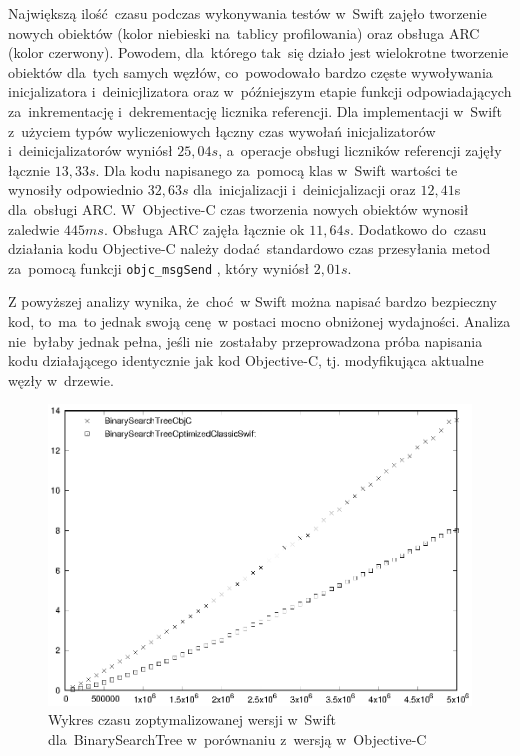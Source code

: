 \documentclass[mgr, shortabstract]{iithesis}
\newcommand{\objcinline}[1]{
    \texttt{#1}
}
\begin{document}
Największą ilość czasu podczas wykonywania testów w~Swift zajęło tworzenie nowych obiektów (kolor niebieski na~tablicy profilowania) oraz obsługa ARC (kolor czerwony). Powodem, dla~którego tak~się działo jest wielokrotne tworzenie obiektów dla~tych samych węzłów, co~powodowało bardzo częste wywoływania inicjalizatora i~deinicjlizatora oraz w~późniejszym etapie funkcji odpowiadających za~inkrementację i~dekrementację licznika referencji. Dla implementacji w~Swift z~użyciem typów wyliczeniowych łączny czas wywołań inicjalizatorów i~deinicjalizatorów wyniósł $25,04s$, a~operacje obsługi liczników referencji zajęły łącznie $13,33s$. Dla kodu napisanego za~pomocą klas w~Swift wartości te wynosiły odpowiednio $32,63s$ dla~inicjalizacji i~deinicjalizacji oraz $12,41$s dla~obsługi ARC. W~Objective-C czas tworzenia nowych obiektów wynosił zaledwie $445ms$. Obsługa ARC zajęła łącznie ok $11,64s$. Dodatkowo do~czasu działania kodu Objective-C należy dodać standardowo czas przesyłania metod za~pomocą funkcji \objcinline{objc_msgSend}, który wyniósł $2,01s$.

Z powyższej analizy wynika, że~choć w Swift można napisać bardzo bezpieczny kod, to~ma~to jednak swoją cenę w postaci mocno obniżonej wydajności. Analiza nie~byłaby jednak pełna, jeśli nie~zostałaby przeprowadzona próba napisania kodu działającego identycznie jak kod Objective-C, tj. modyfikująca aktualne węzły w~drzewie. 

\begin{figure}
    \includegraphics{plots/BinarySearchTree2.eps}
    \caption{Wykres czasu zoptymalizowanej wersji w~Swift dla~BinarySearchTree w~porównaniu z~wersją w~Objective-C}
    \label{p:binary_search2}
\end{figure}
\end{document}
